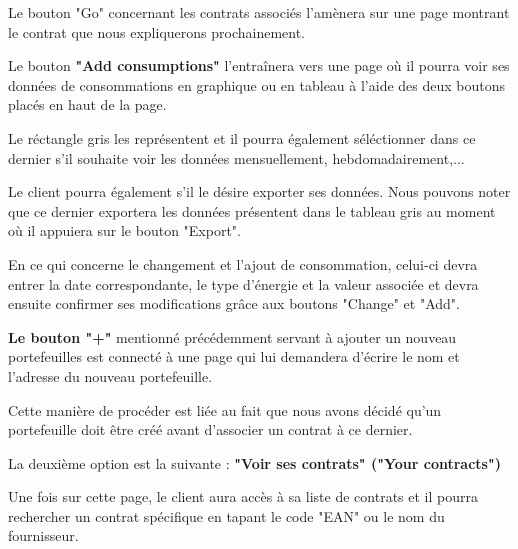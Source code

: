 \begin{flushleft}
Le bouton "Go" concernant les contrats associés l'amènera sur une page montrant le contrat que nous expliquerons prochainement.
\end{flushleft}

\begin{flushleft}
Le bouton \textbf{"Add consumptions"} l'entraînera vers une page où il pourra voir ses données de consommations en graphique ou en tableau à l'aide des deux boutons placés en haut de la page.
\end{flushleft}
\begin{flushleft}
Le réctangle gris les représentent et il pourra également séléctionner dans ce dernier s'il souhaite voir les données mensuellement, hebdomadairement,...
\end{flushleft}
\begin{flushleft}
Le client pourra également s'il le désire exporter ses données.
Nous pouvons noter que ce dernier exportera les données présentent dans le tableau gris au moment où il appuiera sur le bouton "Export".
\end{flushleft}
\begin{flushleft}
En ce qui concerne le changement et l'ajout de consommation, celui-ci devra entrer la date correspondante, le type d'énergie et la valeur associée et devra ensuite confirmer ses modifications grâce aux boutons "Change" et "Add".
\end{flushleft}

\begin{flushleft}
\textbf{Le bouton "+"} mentionné précédemment servant à ajouter un nouveau portefeuilles est connecté à une page qui lui demandera d'écrire le nom et l'adresse du nouveau portefeuille.
\end{flushleft}

\begin{flushleft}
Cette manière de procéder est liée au fait que nous avons décidé qu'un portefeuille doit être créé avant d'associer un contrat à ce dernier.
\end{flushleft}

\begin{flushleft}
La deuxième option est la suivante : \textbf{"Voir ses contrats" ("Your contracts")}
\end{flushleft}

\begin{flushleft}
Une fois sur cette page, le client aura accès à sa liste de contrats et il pourra rechercher un contrat spécifique en tapant le code "EAN" ou le nom du fournisseur.
\end{flushleft}

